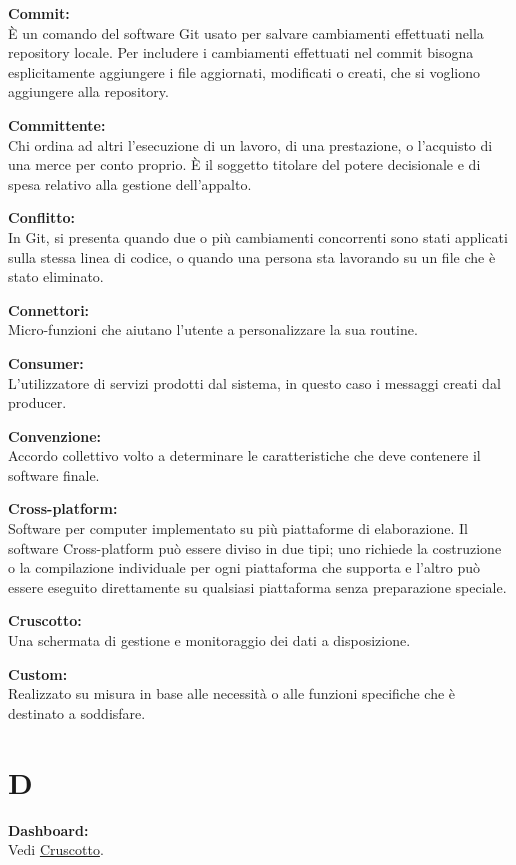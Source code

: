 \documentclass[a4paper, oneside, openany, dvipsnames, table]{article}
\begin{document}
\textbf{Commit:}\\ \`E un comando del software Git usato per salvare cambiamenti effettuati nella repository locale. Per includere i cambiamenti effettuati nel commit bisogna esplicitamente aggiungere i file aggiornati, modificati o creati, che si vogliono aggiungere alla repository.


\textbf{Committente:}\\	Chi ordina ad altri l’esecuzione di un lavoro, di una prestazione, o l’acquisto di una merce per conto proprio. \`E il soggetto titolare del potere decisionale e di spesa relativo alla gestione dell'appalto.

\textbf{Conflitto:}\\	In Git, si presenta quando due o più cambiamenti concorrenti sono stati applicati sulla stessa linea di codice, o quando una persona sta lavorando su un file che è stato eliminato.

\textbf{Connettori:}\\ Micro-funzioni che aiutano l'utente a personalizzare la sua routine.

\textbf{Consumer:}\\ L'utilizzatore di servizi prodotti dal sistema, in questo caso i messaggi creati dal producer.

\textbf{Convenzione:}\\	Accordo collettivo volto a determinare le caratteristiche che deve contenere il software finale.

\textbf{Cross-platform:}\\	 Software per computer implementato su più piattaforme di elaborazione. Il software Cross-platform può essere diviso in due tipi; uno richiede la costruzione o la compilazione individuale per ogni piattaforma che supporta e l'altro può essere eseguito direttamente su qualsiasi piattaforma senza preparazione speciale.

\label{crts:Cruscotto}
\textbf{Cruscotto:}\\	Una schermata di gestione e monitoraggio dei dati a disposizione.

\textbf{Custom:}\\	Realizzato su misura in base alle necessità o alle funzioni specifiche che è destinato a soddisfare.	


\newpage

\section{D}
\textbf{Dashboard:}	\\  Vedi \hyperref[crts:Cruscotto]{Cruscotto}.
\end{document}
